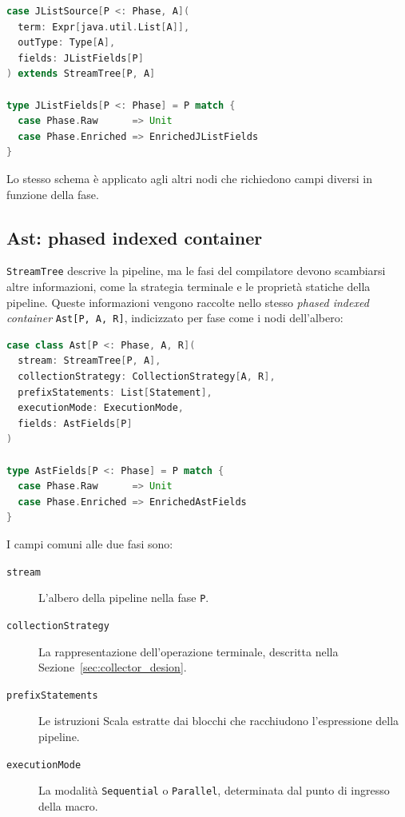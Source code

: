 \documentclass[a4paper,11pt]{report}
\theoremstyle{definition}
\begin{document}
\begin{lstlisting}[language=Scala]
case JListSource[P <: Phase, A](
  term: Expr[java.util.List[A]],
  outType: Type[A],
  fields: JListFields[P]
) extends StreamTree[P, A]

type JListFields[P <: Phase] = P match {
  case Phase.Raw      => Unit
  case Phase.Enriched => EnrichedJListFields
}
\end{lstlisting}

Lo stesso schema è applicato agli altri nodi che richiedono campi diversi in funzione della fase.

\subsection{Ast: phased indexed container}
\label{subsec:ast-containers}

\texttt{StreamTree} descrive la pipeline, ma le fasi del compilatore devono scambiarsi altre informazioni, come la strategia terminale e le proprietà statiche della pipeline. Queste informazioni vengono raccolte nello stesso \emph{phased indexed container} \texttt{Ast[P, A, R]}, indicizzato per fase come i nodi dell'albero:

\begin{lstlisting}[language=Scala]
case class Ast[P <: Phase, A, R](
  stream: StreamTree[P, A],
  collectionStrategy: CollectionStrategy[A, R],
  prefixStatements: List[Statement],
  executionMode: ExecutionMode,
  fields: AstFields[P]
)

type AstFields[P <: Phase] = P match {
  case Phase.Raw      => Unit
  case Phase.Enriched => EnrichedAstFields
}
\end{lstlisting}

I campi comuni alle due fasi sono:

\begin{description}
  \item[\texttt{stream}] L'albero della pipeline nella fase \texttt{P}.
  \item[\texttt{collectionStrategy}] La rappresentazione dell'operazione terminale, descritta nella Sezione~\ref{sec:collector_desion}.
  \item[\texttt{prefixStatements}] Le istruzioni Scala estratte dai blocchi che racchiudono l'espressione della pipeline.
  \item[\texttt{executionMode}] La modalità \texttt{Sequential} o \texttt{Parallel}, determinata dal punto di ingresso della macro.
\end{description}
\end{document}
